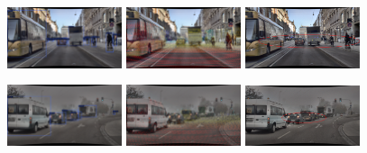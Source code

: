 \documentclass[report.tex]{subfiles}
\begin{document}

        \begin{figure}[ht!]
            \centering
            \includegraphics[width=0.3\textwidth]{images/datasets/dense/samples/day/2018-02-05_12-07-39_00300.png}\hfill
            \includegraphics[width=0.3\textwidth]{images/datasets/dense/samples/day/clean_lidar.png}\hfill
            \includegraphics[width=0.3\textwidth]{images/datasets/dense/samples/day/clean_radar_annotated.png}
          
            \includegraphics[width=0.3\textwidth]{images/datasets/dense/samples/light_fog/2018-10-08_08-10-40_02160.png}\hfill
            \includegraphics[width=0.3\textwidth]{images/datasets/dense/samples/light_fog/light_fog_lidar.png}\hfill
            \includegraphics[width=0.3\textwidth]{images/datasets/dense/samples/light_fog/light_fog_radar_ann.png}
          

\end{figure}
\end{document}

